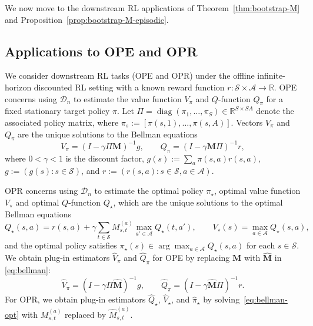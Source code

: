 \documentclass{article}
\numberwithin{equation}{section}
\begin{document}
We now move to the downstream RL applications of Theorem~\ref{thm:bootstrap-M} and Proposition~\ref{prop:bootstrap-M-episodic}.
\subsection{Applications to OPE and OPR}
\label{sec:ope-opr-applications}
We consider downstream RL tasks (OPE and OPR) under the offline infinite-horizon discounted RL setting with a known reward function $r:\mathcal{S}\times\mathcal{A}\to\mathbb{R}$.
OPE concerns using $\mathcal{D}_n$ to estimate the value function $V_\pi$ and $Q$-function $Q_\pi$ for a fixed stationary target policy $\pi$.
Let $\Pi = \operatorname{diag}(\pi_1,\dots,\pi_S)\in\mathbb{R}^{S\times SA}$ denote the associated policy matrix, where $\pi_s := [\pi(s,1),\ldots,\pi(s,A)]$.
Vectors $V_\pi$ and $Q_\pi$ are the unique solutions to the Bellman equations \citep{bertsekas2011dynamic,agarwal2019reinforcement}
\begin{equation}
\label{eq:bellman}
V_\pi = (I-\gamma\Pi\mathbf{M})^{-1}g, \qquad Q_\pi = (I-\gamma\mathbf{M}\Pi)^{-1}r,
\end{equation}
where $0<\gamma<1$ is the discount factor, $g(s):=\sum_a \pi(s,a)r(s,a)$, $g := (g(s): s \in \mathcal{S})$, and $r := (r(s,a): s\in\mathcal{S}, a\in\mathcal{A})$.

OPR concerns using $\mathcal{D}_n$ to estimate the optimal policy $\pi_\star$, optimal value function $V_\star$ and optimal $Q$-function $Q_\star$, which are the unique solutions to the optimal Bellman equations
\begin{equation}
\label{eq:bellman-opt}
Q_\star(s,a) = r(s,a) + \gamma\sum_{t\in\mathcal{S}} M^{(a)}_{s,t}\max_{a'\in\mathcal{A}} Q_\star(t,a'),
\qquad
V_\star(s) = \max_{a\in\mathcal{A}} Q_\star(s,a),
\end{equation}
and the optimal policy satisfies $\pi_\star(s)\in\arg\max_{a\in\mathcal{A}}Q_\star(s,a)$ for each $s\in\mathcal{S}$.
We obtain plug-in estimators $\hat V_\pi$ and $\hat Q_\pi$ for OPE by replacing $\mathbf{M}$ with $\hat{\mathbf{M}}$ in \eqref{eq:bellman}:
\begin{equation}
\label{eq:plugin}
\hat V_\pi = (I-\gamma\Pi\hat{\mathbf{M}})^{-1}g,
\qquad
\hat Q_\pi = (I-\gamma\hat{\mathbf{M}}\Pi)^{-1}r.
\end{equation}
For OPR, we obtain plug-in estimators $\hat Q_\star$, $\hat V_\star$, and $\hat\pi_\star$ by solving~\eqref{eq:bellman-opt} with $M^{(a)}_{s,t}$ replaced by $\hat M^{(a)}_{s,t}$.
\end{document}
